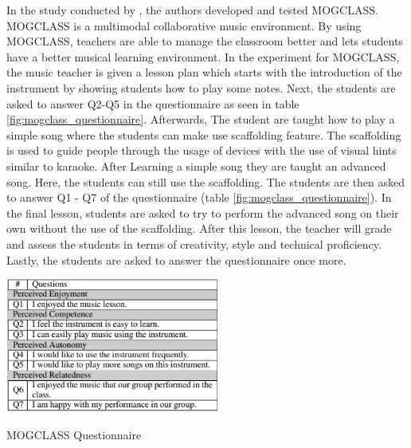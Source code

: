 \newpage

In the study conducted by , the authors developed and tested MOGCLASS. MOGCLASS is a multimodal collaborative music environment. By using MOGCLASS, teachers are able to manage the classroom better and lets students have a better musical learning environment. In the experiment for MOGCLASS, the music teacher is given a lesson plan which starts with the introduction of the instrument by showing students how to play some notes. Next, the students are asked to answer Q2-Q5 in the questionnaire as seen in table \ref{fig:mogclass_questionnaire}. Afterwards, The student are taught how to play a simple song where the students can make use scaffolding feature. The scaffolding is used to guide people through the usage of devices with the use of visual hints similar to karaoke. After Learning a simple song they are taught an advanced song. Here, the students can still use the scaffolding. The students are then asked to answer Q1 - Q7 of the questionnaire (table \ref{fig:mogclass_questionnaire}). In the final lesson, students are asked to try to perform the advanced song on their own without the use of the scaffolding. After this lesson, the teacher will grade and assess the students in terms of creativity, style and technical proficiency. Lastly, the students are asked to answer the questionnaire once more.

\begin{table}[H]
    \centering
    \includegraphics[width=7cm]{mogclass_questionaire.PNG}
    \caption{MOGCLASS Questionnaire \protect\cite{zhou2011mogclass}}
    \label{fig:mogclass_questionnaire}
\end{table}

